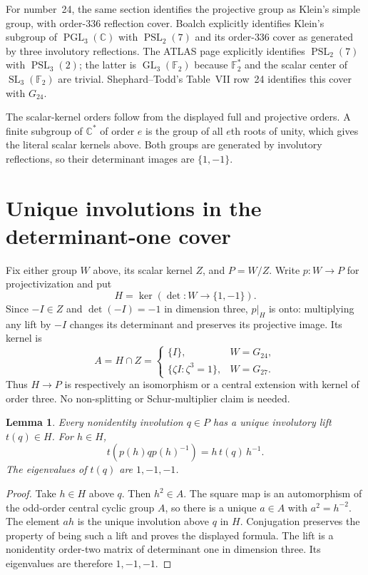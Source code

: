 \documentclass[11pt]{article}
\newtheorem{lemma}[theorem]{Lemma}
\newcommand{\C}{\mathbb C}
\newcommand{\F}{\mathbb F}
\newcommand{\GL}{\operatorname{GL}}
\newcommand{\SL}{\operatorname{SL}}
\newcommand{\PSL}{\operatorname{PSL}}
\begin{document}
For number~24, the same section identifies the projective group as
Klein's simple group, with order-$336$ reflection cover. Boalch
\cite[printed p.~1]{boalch} explicitly identifies Klein's subgroup
of $\operatorname{PGL}_3(\C)$ with $\PSL_2(7)$ and its order-$336$
cover as generated by three involutory reflections.
The ATLAS page \cite{atlas} explicitly identifies $\PSL_2(7)$ with
$\PSL_3(2)$; the latter is $\GL_3(\F_2)$ because $\F_2^*$ and the
scalar center of $\SL_3(\F_2)$ are trivial.
Shephard--Todd's Table~VII row~24 identifies this cover with $G_{24}$.

The scalar-kernel orders follow from the displayed full and
projective orders. A finite subgroup of $\C^*$ of order $e$ is the
group of all $e$th roots of unity, which gives the literal scalar
kernels above. Both groups are generated by involutory reflections,
so their determinant images are $\{1,-1\}$.

\section{Unique involutions in the determinant-one cover}

Fix either group $W$ above, its scalar kernel $Z$, and $P=W/Z$.
Write $p:W\to P$ for projectivization and put
\[
                         H=\ker(\det:W\to\{1,-1\}).
\]
Since $-I\in Z$ and $\det(-I)=-1$ in dimension three,
$p|_H$ is onto: multiplying any lift by $-I$ changes its determinant
and preserves its projective image. Its kernel is
\[
 A=H\cap Z=\begin{cases}
 \{I\},&W=G_{24},\\
 \{\zeta I:\zeta^3=1\},&W=G_{27}.
 \end{cases}
\]
Thus $H\to P$ is respectively an isomorphism or a central extension
with kernel of order three. No non-splitting or Schur-multiplier
claim is needed.

\begin{lemma}\label{lem:unique}
Every nonidentity involution $q\in P$ has a unique involutory lift
$t(q)\in H$. For $h\in H$,
\[
                   t(p(h)qp(h)^{-1})=h\,t(q)\,h^{-1}.
\]
The eigenvalues of $t(q)$ are $1,-1,-1$.
\end{lemma}
\begin{proof}
Take $h\in H$ above $q$. Then $h^2\in A$. The square map is an
automorphism of the odd-order central cyclic group $A$, so there
is a unique $a\in A$ with $a^2=h^{-2}$. The element $ah$ is the
unique involution above $q$ in $H$. Conjugation preserves the
property of being such a lift and proves the displayed formula.
The lift is a nonidentity order-two matrix of determinant one in
dimension three. Its eigenvalues are therefore $1,-1,-1$.
\end{proof}
\end{document}
